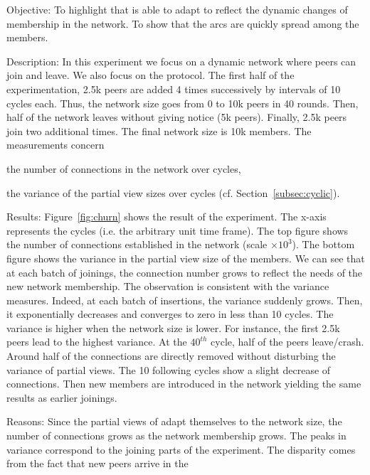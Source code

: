 \begin{asparadesc}
\item[Objective:] To highlight that \SPRAY is able to adapt to reflect the
  dynamic changes of membership in the network. To show that the arcs are
  quickly spread among the members.
\item[Description:] In this experiment we focus on a dynamic network where
  peers can join and leave. We also focus on the \SPRAY protocol. The first
  half of the experimentation, 2.5k peers are added 4 times successively by
  intervals of 10 cycles each. Thus, the network size goes from 0 to 10k peers
  in 40 rounds. Then, half of the network leaves without giving notice (5k
  peers). Finally, 2.5k peers join two additional times. The final network size
  is 10k members. The measurements concern
  \begin{inparaenum}
  \item the number of connections in the network over cycles,
  \item the variance of the partial view sizes over cycles
    (cf. Section~\ref{subsec:cyclic}).
  \end{inparaenum}
\item[Results:] Figure~\ref{fig:churn} shows the result of the experiment. The
  x-axis represents the cycles (i.e. the arbitrary unit time frame). The top
  figure shows the number of connections established in the network (scale
  $\times 10^3$). The bottom figure shows the variance in the partial view size
  of the members. We can see that at each batch of joinings, the connection
  number grows to reflect the needs of the new network membership. The
  observation is consistent with the variance measures. Indeed, at each batch
  of insertions, the variance suddenly grows. Then, it exponentially decreases
  and converges to zero in less than 10 cycles. The variance is higher when the
  network size is lower. For instance, the first 2.5k peers lead to the highest
  variance. At the $40^{th}$ cycle, half of the peers leave/crash. Around half
  of the connections are directly removed without disturbing the variance of
  partial views. The 10 following cycles show a slight decrease of
  connections. Then new members are introduced in the network yielding the same
  results as earlier joinings.
\item[Reasons:] Since the partial views of \SPRAY adapt themselves to the
  network size, the number of connections grows as the network membership
  grows.  The peaks in variance correspond to the joining parts of the
  experiment. The disparity comes from the fact that new peers arrive in the

\end{asparadesc}
